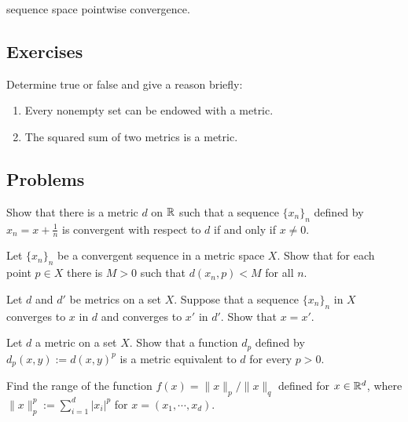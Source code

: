 \begin{ex}
sequence space pointwise convergence.
\end{ex}



\subsection*{Exercises}
Determine true or false and give a reason briefly:
\begin{enumerate}
\item Every nonempty set can be endowed with a metric.
\item The squared sum of two metrics is a metric.
\end{enumerate}

\subsection*{Problems}
\begin{prb}
Show that there is a metric $d$ on $\mathbb{R}$ such that a sequence $\{x_n\}_n$ defined by $x_n=x+\frac1n$ is convergent with respect to $d$ if and only if $x\ne0$.
\end{prb}
\begin{prb}
Let $\{x_n\}_n$ be a convergent sequence in a metric space $X$.
Show that for each point $p\in X$ there is $M>0$ such that $d(x_n,p)<M$ for all $n$.
\end{prb}
\begin{prb}
Let $d$ and $d'$ be metrics on a set $X$.
Suppose that a sequence $\{x_n\}_n$ in $X$ converges to $x$ in $d$ and converges to $x'$ in $d'$.
Show that $x=x'$.
\end{prb}
\begin{prb}
Let $d$ a metric on a set $X$.
Show that a function $d_p$ defined by $d_p(x,y):=d(x,y)^p$ is a metric equivalent to $d$ for every $p>0$.
\end{prb}
\begin{prb}
Find the range of the function $f(x)=\|x\|_p/\|x\|_q$ defined for $x\in\mathbb{R}^d$, where $\|x\|_p^p:=\sum_{i=1}^d|x_i|^p$ for $x=(x_1,\cdots,x_d)$.
\end{prb}

























